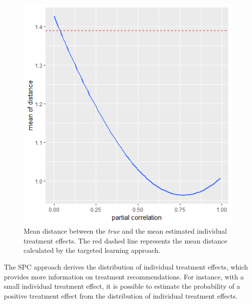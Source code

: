 	\begin{figure}[ht!]
		\centering
		\includegraphics{plots/ICE.DIS} 
		\caption{Mean distance between the \emph{true} and the mean estimated individual treatment effects. The red dashed line represents the mean distance calculated by the targeted learning approach.}
		\label{fig4_6}
	\end{figure}
	
	The SPC approach derives the distribution of individual treatment effects, which provides more information on treatment recommendations. For instance, with a small individual treatment effect, it is possible to estimate the probability of a positive treatment effect from the distribution of individual treatment effects. 
		
